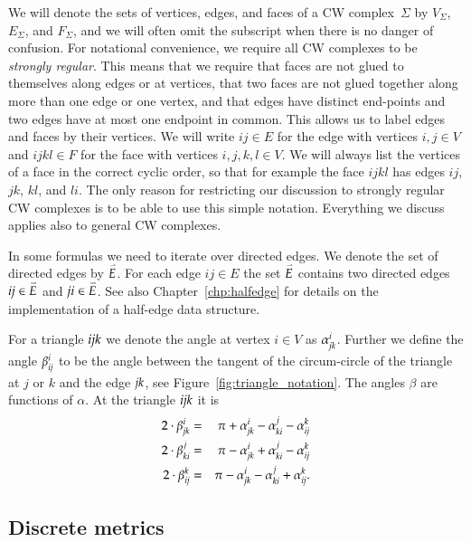 \documentclass[Thesis]{subfiles}
\begin{document}
We will denote the sets of vertices, edges, and faces of a CW complex~$\Sigma$ by $V_{\Sigma}$, $E_{\Sigma}$, and $F_{\Sigma}$, and we will often omit the subscript when there is no danger of confusion.
For notational convenience, we require all CW complexes to be \emph{strongly regular}. 
This means that we require that faces are not glued to themselves along edges or at vertices, that two faces are not glued together along more than one edge or one vertex, and that edges have distinct end-points and two edges have at most one endpoint in common. 
This allows us to label edges and faces by their vertices. 
We will write $\mathit{ij}\in E$ for the edge with vertices $i,j\in V$ and $\mathit{ijkl}\in F$ for the face with vertices $i,j,k,l\in V$. 
We will always list the vertices of a face in the correct cyclic order, so that for example the face $\mathit{ijkl}$ has edges $\mathit{ij}$, $\mathit{jk}$, $\mathit{kl}$, and $\mathit{li}$.
The only reason for restricting our discussion to strongly regular CW complexes is to be able to use this simple notation. 
Everything we discuss applies also to general CW complexes.

In some formulas we need to iterate over directed edges. 
We denote the set of directed edges by $\accentset{\rightharpoonup}{E}$. 
For each edge $\mathit{ij}\in E$ the set $\accentset{\rightharpoonup}{E}$ contains two
directed edges $\mathit{ij}\in \accentset{\rightharpoonup}{E}$ and $\mathit{ji}\in \accentset{\rightharpoonup}{E}$.
See also Chapter~\ref{chp:halfedge} for details on the implementation of a half-edge data structure.

For a triangle $\it ijk$ we denote the angle at vertex $i\in V$ as $\alpha^i_{\it jk}$. 
Further we define the angle $\beta^i_{\it ij}$ to be the angle between the tangent of the circum-circle of the triangle at $j$ or $k$ and the edge $\it jk$, see Figure~\ref{fig:triangle_notation}.
The angles $\beta$ are functions of $\alpha$. At the triangle $\it ijk$ it is
\begin{eqnarray*}
	2\cdot\beta_{\it jk}^i &=& \pi + \alpha_{\it jk}^i - \alpha_{\it ki}^j - \alpha_{\it ij}^k\\
	2\cdot\beta_{\it ki}^j &=& \pi - \alpha_{\it jk}^i + \alpha_{\it ki}^j - \alpha_{\it ij}^k\\
	2\cdot\beta_{\it ij}^k &=& \pi - \alpha_{\it jk}^i - \alpha_{\it ki}^j + \alpha_{\it ij}^k.
\end{eqnarray*}

\subsection{Discrete metrics}
\label{sec:discrete-metrics}
\end{document}
